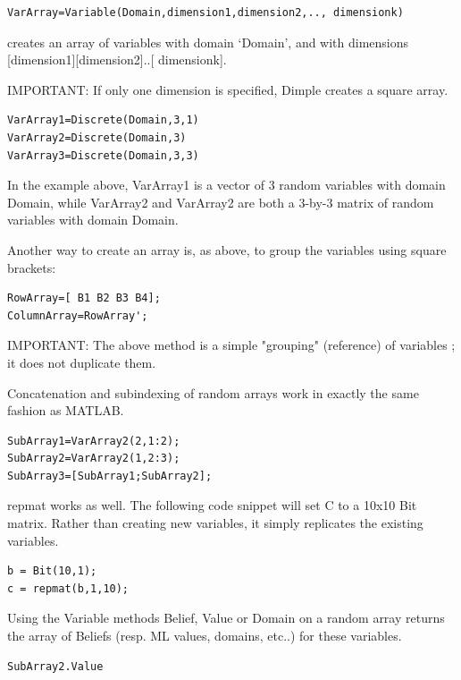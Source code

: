 \begin{lstlisting}
VarArray=Variable(Domain,dimension1,dimension2,.., dimensionk) 
\end{lstlisting}

creates an array of variables with domain `Domain', and with dimensions [dimension1][dimension2]..[ dimensionk]. 

IMPORTANT: If only one dimension is specified, Dimple creates a square array.


\begin{lstlisting}
VarArray1=Discrete(Domain,3,1)
VarArray2=Discrete(Domain,3)
VarArray3=Discrete(Domain,3,3)
\end{lstlisting}



In the example above, VarArray1 is a vector of 3 random variables with domain Domain, while VarArray2 and VarArray2 are both a 3-by-3 matrix of random variables with domain Domain.

Another way to create an array is, as above, to group the variables using square brackets:


\begin{lstlisting}
RowArray=[ B1 B2 B3 B4];
ColumnArray=RowArray';
\end{lstlisting}

IMPORTANT: The above method is a simple "grouping" (reference) of variables  ; it does not duplicate them.

Concatenation and subindexing of random arrays work in exactly the same fashion as MATLAB.


\begin{lstlisting}
SubArray1=VarArray2(2,1:2);
SubArray2=VarArray2(1,2:3);
SubArray3=[SubArray1;SubArray2];
\end{lstlisting}

repmat works as well.  The following code snippet will set C to a 10x10 Bit matrix.  Rather than creating new
variables, it simply replicates the existing variables.  

\begin{lstlisting}
b = Bit(10,1);
c = repmat(b,1,10);
\end{lstlisting}



Using the Variable methods Belief, Value or Domain on a random array returns the array of Beliefs (resp. ML values, domains, etc..) for these variables.


\begin{lstlisting}
SubArray2.Value
\end{lstlisting}

